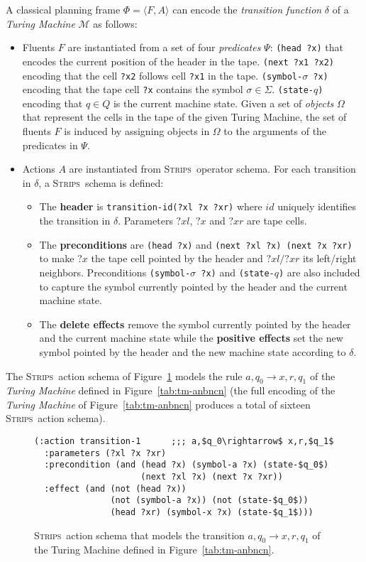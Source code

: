 \documentclass[letterpaper]{article} %
\newcommand{\tup}[1]{{\langle #1 \rangle}}
\newcommand{\strips}{\textsc{Strips}}     %
\begin{document}
A classical planning frame $\Phi=\tup{F,A}$ can encode the {\em transition function} $\delta$ of a {\em Turing Machine} $\mathcal{M}$ as follows:
\begin{itemize}
\item Fluents $F$ are instantiated from a set of four {\em predicates} $\Psi$: {\small\tt (head ?x)} that encodes the current position of the header in the tape. {\small\tt (next ?x1 ?x2)} encoding that the cell {\tt ?x2} follows cell {\tt ?x1} in the tape. {\small\tt (symbol-$\sigma$ ?x)} encoding that the tape cell {\tt ?x} contains the symbol $\sigma\in\Sigma$. {\small\tt (state-$q$)} encoding that $q\in Q$ is the current machine state. Given a set of {\em objects} $\Omega$ that represent the cells in the tape of the given Turing Machine, the set of fluents $F$ is induced by assigning objects in $\Omega$ to the arguments of the predicates in $\Psi$.
\item Actions $A$ are instantiated from \strips\ operator schema. For each transition in $\delta$, a \strips\ schema is defined:
\begin{itemize}
\item The {\bf header} is {\small\tt transition-id(?xl ?x ?xr)} where $id$ uniquely identifies the transition in $\delta$. Parameters $?xl$, $?x$ and $?xr$ are tape cells.
\item The {\bf preconditions} are {\small\tt(head ?x)} and {\small\tt (next ?xl ?x) (next ?x ?xr)} to make $?x$ the tape cell pointed by the header and $?xl/?xr$ its left/right neighbors. Preconditions {\small\tt(symbol-$\sigma$ ?x)} and {\small\tt (state-$q$)} are also included to capture the symbol currently pointed by the header and the current machine state.
\item The {\bf delete effects} remove the symbol currently pointed by the header and the current machine state while the {\bf positive effects} set the new symbol pointed by the header and the new machine state according to $\delta$.
\end{itemize}
\end{itemize}

The \strips\ action schema of Figure~\ref{fig:update-rule} models the rule $a,q_0\rightarrow x,r,q_1$ of the {\em Turing Machine} defined in Figure~\ref{tab:tm-anbncn} (the full encoding of the {\em Turing Machine} of Figure~\ref{tab:tm-anbncn} produces a total of sixteen \strips\ action schema). 
\begin{figure}
\begin{scriptsize}
\begin{lstlisting}
(:action transition-1      ;;; a,$q_0\rightarrow$ x,r,$q_1$
  :parameters (?xl ?x ?xr)
  :precondition (and (head ?x) (symbol-a ?x) (state-$q_0$)
                     (next ?xl ?x) (next ?x ?xr))
  :effect (and (not (head ?x)) 
               (not (symbol-a ?x)) (not (state-$q_0$))
               (head ?xr) (symbol-x ?x) (state-$q_1$)))
\end{lstlisting}
\end{scriptsize}
 \caption{\small \strips\ action schema that models the transition $a,q_0\rightarrow x,r,q_1$ of the Turing Machine defined in Figure~\ref{tab:tm-anbncn}.}
\label{fig:update-rule}
\end{figure}
\end{document}
